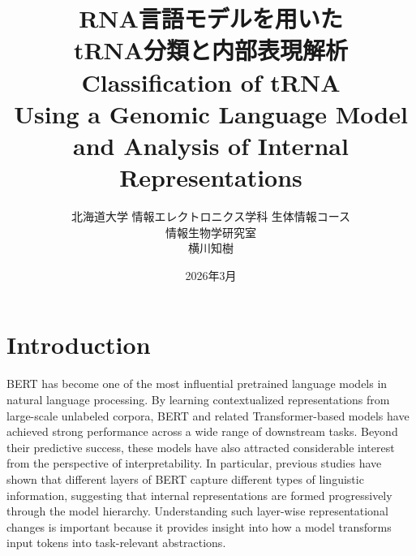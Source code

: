 \documentclass[a4paper,11pt,draft]{jsarticle}
\title{%
RNA言語モデルを用いた\\tRNA分類と内部表現解析\\[0.8em]
{\LARGE\mdseries Classification of tRNA\\ Using a Genomic Language Model and Analysis of Internal Representations}%
}
\author{北海道大学 情報エレクトロニクス学科 生体情報コース\\
情報生物学研究室\\
横川知樹}
\date{2026年3月}
\begin{document}
\maketitle
\thispagestyle{empty} %

\clearpage
\null
\thispagestyle{empty}


\tableofcontents


\renewcommand{\listfigurename}{図一覧}
\renewcommand{\listtablename}{表一覧}

\newcommand{\addtotoc}[2]{%
  \clearpage
  \phantomsection
  \addcontentsline{toc}{#1}{#2}%
}




\clearpage
\pagestyle{plain}


\section{Introduction}

BERT\cite{devlin2019bert} has become one of the most influential pretrained language models in natural language processing. 
By learning contextualized representations from large-scale unlabeled corpora, BERT and related Transformer-based models have achieved strong performance across a wide range of downstream tasks\cite{gardazi2025bert}. 
Beyond their predictive success, these models have also attracted considerable interest from the perspective of interpretability. 
In particular, previous studies have shown that different layers of BERT capture different types of linguistic information, suggesting that internal representations are formed progressively through the model hierarchy\cite{jawahar2019does}.
Understanding such layer-wise representational changes is important because it provides insight into how a model transforms input tokens into task-relevant abstractions. 
\end{document}
